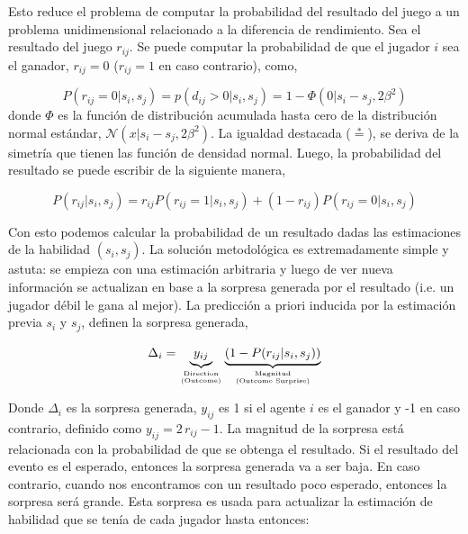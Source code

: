 \documentclass[11pt,twoside,spanish]{report} %
\newcommand\hfrac[2]{\genfrac{}{}{0pt}{}{#1}{#2}}
\begin{document}
Esto reduce el problema de computar la probabilidad del resultado del juego a un problema unidimensional relacionado a la diferencia de rendimiento.
Sea el resultado del juego $r_{ij}$.
Se puede computar la probabilidad de que el jugador $i$ sea el ganador, $r_{ij} = 0$ ($r_{ij} = 1$ en caso contrario), como,

\begin{equation}
P(r_{ij}=0|s_i,s_j) = p(d_{ij} > 0 | s_i, s_j) = 1 - \Phi \left(0|s_i - s_j,2\beta^2 \right) 
\end{equation}
donde $\Phi$ es la funci\'on de distribuci\'on acumulada hasta cero de la distribuci\'on normal est\'andar, $\mathcal{N}(x|s_i - s_j, 2\beta^2 )$.
La igualdad destacada ($\overset{*}{=}$), se deriva de la simetr\'ia que tienen las funci\'on de densidad normal.
Luego, la probabilidad del resultado se puede escribir de la siguiente manera,

\begin{equation}
P(r_{ij}|s_i,s_j) = r_{ij}P(r_{ij}=1|s_i,s_j) +  (1-r_{ij})P(r_{ij}=0|s_i,s_j)
\end{equation}

Con esto podemos calcular la probabilidad de un resultado dadas las estimaciones de la habilidad $ (s_i, s_j) $.
La soluci\'on metodol\'ogica es extremadamente simple y astuta: se empieza con una estimaci\'on arbitraria y luego de ver nueva informaci\'on se actualizan en base a la sorpresa generada por el resultado (i.e. un jugador d\'ebil le gana al mejor).
La predicci\'on a priori inducida por la estimaci\'on previa $s_i$ y $s_j$, definen la sorpresa generada,

\begin{equation}
\Delta_i = \underbrace{y_{ij}}_{\hfrac{\text{Direction}}{\text{(Outcome)}}}\underbrace{\left(1-P(r_{ij}|s_i,s_j)\right)}_{\hfrac{\text{Magnitud}}{\text{(Outcome Surprise)}}}
\end{equation}

Donde $\Delta_i$ es la sorpresa generada, $y_{ij}$ es 1 si el agente $i$ es el ganador y -1 en caso contrario, definido como $y_{ij} =  2\,r_{ij} - 1$.
La magnitud de la sorpresa est\'a relacionada con la probabilidad de que se obtenga el resultado.
Si el resultado del evento es el esperado, entonces la sorpresa generada va a ser baja.
En caso contrario, cuando nos encontramos con un resultado poco esperado, entonces la sorpresa ser\'a grande.
Esta sorpresa es usada para actualizar la estimaci\'on de habilidad que se ten\'ia de cada jugador hasta entonces:
\end{document}
